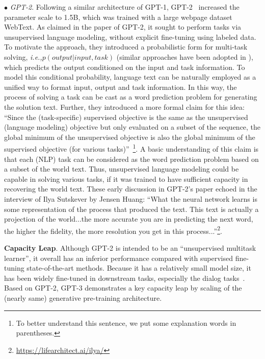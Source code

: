 $\bullet$ \emph{GPT-2}. Following a similar architecture of GPT-1,  GPT-2~\cite{radford-blog-2019-language} increased the parameter scale to 1.5B, which was trained with a large webpage dataset WebText. As claimed in the paper of GPT-2, it sought to perform tasks via unsupervised language modeling, without  explicit fine-tuning using labeled data. To motivate the approach, they  introduced a   probabilistic form for  multi-task solving, \emph{i.e.,}$p(output|input, task)$ (similar approaches have been adopted in \cite{McCann-CoRR-2018-The}), which predicts the output conditioned on the input and task information.  To model this conditional probability,  language text can be naturally employed as a unified way to  format  input, output and task information.  In this way, the process of solving a task  can be cast as a word prediction problem for generating the solution text. Further, they introduced  a more formal claim for this idea: ``Since the (task-specific) supervised objective is the same as the unsupervised (language modeling) objective but only evaluated on a subset of the sequence, the global minimum of the unsupervised objective is also the global minimum of the supervised objective (for various tasks)''~\cite{radford-blog-2019-language}\footnote{To better understand this sentence, we put some explanation words in parentheses.}. A basic understanding of this claim is that each (NLP) task can be considered as the word prediction problem based on a subset of the world text. Thus,  unsupervised language modeling could be capable in solving various tasks, if it was trained to have sufficient capacity in recovering the world text. These early discussion in GPT-2's paper echoed in the interview of Ilya Sutskever by Jensen Huang: ``What the neural network learns is some representation of the process that produced the text. This text is actually a projection of the world...the more accurate you are in predicting the next word, the higher the fidelity, the more resolution you get in this process...''\footnote{\url{https://lifearchitect.ai/ilya/}}.   

\textbf{Capacity Leap}. Although GPT-2 is intended to be an  ``unsupervised multitask learner'', it overall has an inferior performance compared with supervised fine-tuning state-of-the-art methods. Because it has a relatively small model size, it has been widely fine-tuned in downstream tasks, especially the dialog tasks~\cite{Zhang-ACL-2020-DIALOGPT,Ham-ACL-2020-End}. Based on GPT-2, GPT-3 demonstrates a  key capacity leap by scaling of the (nearly same) generative pre-training architecture.  

